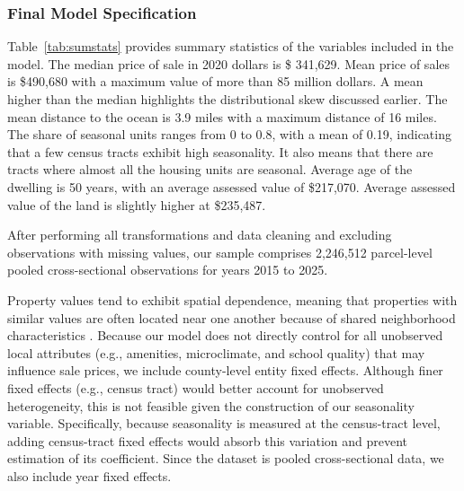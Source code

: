 \documentclass[11pt]{article}
\begin{document}
        \subsubsection{Final Model Specification}



        Table~\ref{tab:sumstats} provides summary statistics of the variables included in the model. The median price of sale in 2020 dollars is \$ 341,629. Mean price of sales is \$490,680 with a maximum value of more than 85 million dollars. A mean higher than the median highlights the distributional skew discussed earlier. The mean distance to the ocean is 3.9 miles with a maximum distance of 16 miles. The share of seasonal units ranges from 0 to 0.8, with a mean of 0.19, indicating that a few census tracts exhibit high seasonality. It also means that there are tracts where almost all the housing units are seasonal. Average age of the dwelling is 50 years, with an average assessed value of \$217,070. Average assessed value of the land is slightly higher at \$235,487. 

        After performing all transformations and data cleaning and excluding observations with missing values, our sample comprises 2,246,512 parcel-level pooled cross-sectional observations for years 2015 to 2025.

        Property values tend to exhibit spatial dependence, meaning that properties with similar values are often located near one another because of shared neighborhood characteristics \parencite{secanmegbolugbe1997-SpatialDependenceHouse, basileetal2014-ModelingRegionalEconomicb}. Because our model does not directly control for all unobserved local attributes (e.g., amenities, microclimate, and school quality) that may influence sale prices, we include county-level entity fixed effects. Although finer fixed effects (e.g., census tract) would better account for unobserved heterogeneity, this is not feasible given the construction of our seasonality variable. Specifically, because seasonality is measured at the census-tract level, adding census-tract fixed effects would absorb this variation and prevent estimation of its coefficient. Since the dataset is pooled cross-sectional data, we also include year fixed effects.
\end{document}
